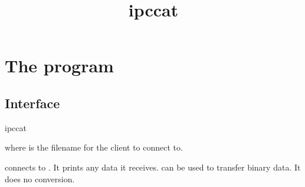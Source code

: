\documentclass{book}
\title{ipccat}
\begin{document}
\section{The  program}

\subsection{Interface}
\begin{code}%
  ipccat 
\end{code}
where  is the filename for the client to connect to.

 connects to .  It prints any data it receives.
 can be used to transfer binary data.  It does no
conversion.
\end{document}

